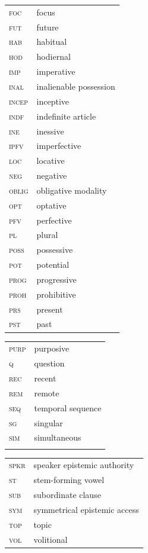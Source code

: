 \documentclass[output=paper,colorlinks,citecolor=brown]{langscibook}
\begin{document}
\begin{tabularx}{.45\textwidth}{lQ}
\scshape foc & focus \\
\scshape fut & future \\
\scshape hab & habitual \\
\scshape hod & hodiernal \\
\scshape imp & imperative \\
\scshape inal & inalienable possession \\
\scshape incep & inceptive \\
\scshape indf & indefinite article \\
\scshape ine & inessive \\
\scshape ipfv & imperfective \\
\scshape loc & locative \\
\scshape neg & negative \\
\scshape oblig & obligative modality \\
\scshape opt & optative \\
\scshape pfv & perfective \\
\scshape pl & plural \\
\scshape poss & possessive \\
\scshape pot & potential \\
\scshape prog & progressive \\
\scshape proh & prohibitive \\
\scshape prs & present \\
\scshape pst & past \\
\end{tabularx}

\begin{tabularx}{.45\textwidth}{lQ}
\scshape purp & purposive \\
\scshape q & question \\
\scshape rec & recent \\
\scshape rem & remote \\
\scshape seq & temporal sequence \\
\scshape sg & singular \\
\scshape sim & simultaneous \\
\\
\end{tabularx}
\begin{tabularx}{.45\textwidth}{lQ}
\scshape spkr & speaker epistemic authority \\
\scshape st & stem-forming vowel \\
\scshape sub & subordinate clause \\
\scshape sym & symmetrical epistemic access \\
\scshape top & topic \\
\scshape vol & volitional \\
\end{tabularx}\vspace*{-5mm}








\printbibliography[heading=subbibliography,notkeyword=this]
\end{document}
